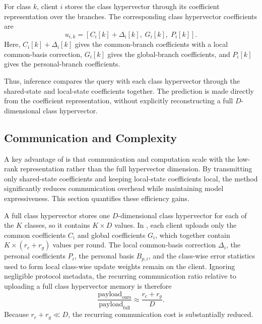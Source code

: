 \documentclass[lettersize,journal]{IEEEtran}
\newcommand{\rev}[1]{#1}
\begin{document}
For class \(k\), client \(i\) stores the class hypervector through its \rev{coefficient representation over the branches}.
The corresponding class hypervector coefficients are
\begin{equation}
\label{eq:infer_class_coord}
u_{i,k} = [C_i[k]+\Delta_i[k],\; G_i[k],\; P_i[k]].
\end{equation}
Here, \(C_i[k]+\Delta_i[k]\) gives the common-branch coefficients with a \rev{local common-basis correction}, \(G_i[k]\) gives the global-branch coefficients, and \(P_i[k]\) gives the personal-branch coefficients.

Thus, inference compares the query with each class hypervector through the \rev{shared-state and local-state coefficients} together.
The prediction is made directly from the \rev{coefficient representation}, without explicitly reconstructing a full \(D\)-dimensional class hypervector.







\subsection{Communication and Complexity}
\label{subsec:cost}

A key advantage of \Design is that communication and computation scale with the low-rank representation rather than the full hypervector dimension.
By transmitting only \rev{shared-state coefficients} and keeping \rev{local-state coefficients} local, the method significantly reduces communication overhead while maintaining model expressiveness.
This section quantifies these efficiency gains.

A full class hypervector stores one $D$-dimensional class hypervector for each of the $K$ classes, so it contains $K\times D$ values.
In \Design, each client uploads only the common coefficients $C_i$ and global coefficients $G_i$, which together contain $K\times(r_c+r_g)$ values per round.
The \rev{local common-basis correction} $\Delta_i$, the personal coefficients $P_i$, the personal basis $B_{p,i}$, and the class-wise error statistics used to form local class-wise update weights remain on the client.
Ignoring negligible protocol metadata, the recurring communication ratio relative to uploading a full class hypervector memory is therefore
\begin{equation}
\label{eq:payload_ratio}
\frac{\text{payload}_{\text{ours}}}{\text{payload}_{\text{full}}}
\approx
\frac{r_c+r_g}{D}.
\end{equation}
Because $r_c+r_g \ll D$, the recurring communication cost is substantially reduced.
\end{document}
